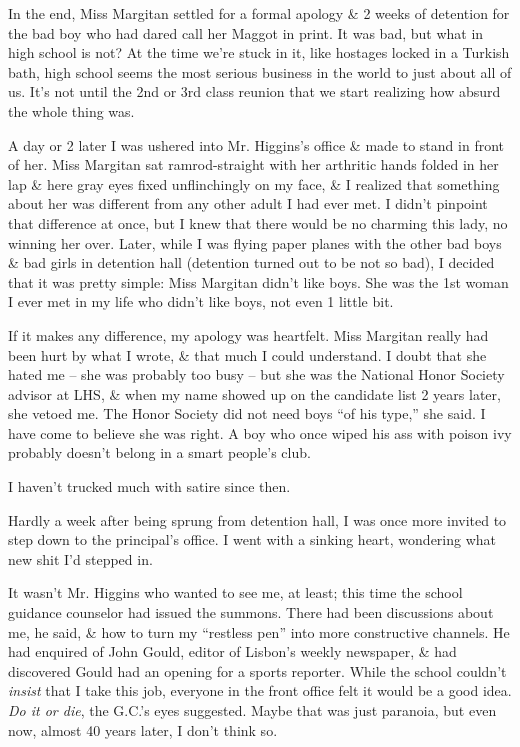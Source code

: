 \documentclass{article}
\numberwithin{equation}{section}
\begin{document}
In the end, Miss Margitan settled for a formal apology \& 2 weeks of detention for the bad boy who had dared call her Maggot in print. It was bad, but what in high school is not? At the time we're stuck in it, like hostages locked in a Turkish bath, high school seems the most serious business in the world to just about all of us. It's not until the 2nd or 3rd class reunion that we start realizing how absurd the whole thing was.

A day or 2 later I was ushered into Mr. Higgins's office \& made to stand in front of her. Miss Margitan sat ramrod-straight with her arthritic hands folded in her lap \& here gray eyes fixed unflinchingly on my face, \& I realized that something about her was different from any other adult I had ever met. I didn't pinpoint that difference at once, but I knew that there would be no charming this lady, no winning her over. Later, while I was flying paper planes with the other bad boys \& bad girls in detention hall (detention turned out to be not so bad), I decided that it was pretty simple: Miss Margitan didn't like boys. She was the 1st woman I ever met in my life who didn't like boys, not even 1 little bit.

If it makes any difference, my apology was heartfelt. Miss Margitan really had been hurt by what I wrote, \& that much I could understand. I doubt that she hated me -- she was probably too busy -- but she was the National Honor Society advisor at LHS, \& when my name showed up on the candidate list 2 years later, she vetoed me. The Honor Society did not need boys ``of his type,'' she said. I have come to believe she was right. A boy who once wiped his ass with poison ivy probably doesn't belong in a smart people's club.

I haven't trucked much with satire since then.

 Hardly a week after being sprung from detention hall, I was once more invited to step down to the principal's office. I went with a sinking heart, wondering what new shit I'd stepped in.

It wasn't Mr. Higgins who wanted to see me, at least; this time the school guidance counselor had issued the summons. There had been discussions about me, he said, \& how to turn my ``restless pen'' into more constructive channels. He had enquired of John Gould, editor of Lisbon's weekly newspaper, \& had discovered Gould had an opening for a sports reporter. While the school couldn't \textit{insist} that I take this job, everyone in the front office felt it would be a good idea. \textit{Do it or die}, the G.C.'s eyes suggested. Maybe that was just paranoia, but even now, almost 40 years later, I don't think so.
\end{document}
